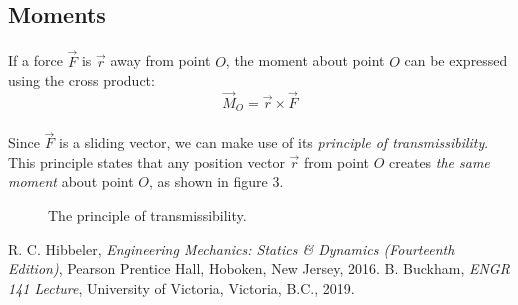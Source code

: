 \documentclass[12pt]{article}
\begin{document}
\subsection{Moments}
\paragraph{}
If a force $\vec{F}$ is $\vec{r}$ away from point $O$, the moment about point $O$ can be expressed using the cross product:
\begin{equation}
    \vec{M}_O = \vec{r} \times \vec{F}
\end{equation}

\paragraph{}
Since $\vec{F}$ is a sliding vector, we can make use of its \textit{principle of transmissibility}.
This principle states that any position vector $\vec{r}$ from point $O$ creates \textit{the same moment} about point $O$, as shown in figure 3.

\begin{figure}[h]
\centering
{}
\caption{The principle of transmissibility.}
\end{figure}


\pagebreak
{}
\begin{thebibliography}{2}
    R. C. Hibbeler, \textit{Engineering Mechanics: Statics \& Dynamics (Fourteenth Edition)}, Pearson Prentice Hall, Hoboken, New Jersey, 2016.
    B. Buckham, \textit{ENGR 141 Lecture}, University of Victoria, Victoria, B.C., 2019.
\end{thebibliography}
\end{document}
